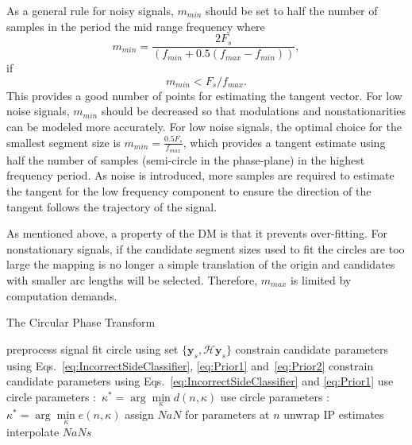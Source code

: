 \documentclass[journal,11pt,a4paper,onecolumn,draftcls]{IEEEtran}
\begin{document}
As a general rule for noisy signals, $m_{min}$ should be set to half the number of samples in the period the mid range frequency where
\begin{equation}\label{eq:MinNumberOfPoints}
	m_{min} = \frac{2F_s}{\left(f_{min}+0.5(f_{max}-f_{min})\right)},
\end{equation}
if 
\begin{equation}
	m_{min} < F_s/f_{max}.
\end{equation}
This provides a good number of points for estimating the tangent vector. For low noise signals, $m_{min}$ should be decreased so that modulations and nonstationarities can be modeled more accurately. For low noise signals, the optimal choice for the smallest segment size is $m_{min}=\frac{0.5F_s}{f_{max}}$, which provides a tangent estimate using half the number of samples (semi-circle in the phase-plane) in the highest frequency period. As noise is introduced, more samples are required to estimate the tangent for the low frequency component to ensure the direction of the tangent follows the trajectory of the signal.

As mentioned above, a property of the DM is that it prevents over-fitting. For nonstationary signals, if the candidate segment sizes used to fit the circles are too large the mapping is no longer a simple translation of the origin and candidates with smaller arc lengths will be selected. Therefore, $m_{max}$ is limited by computation demands.

\begin{algorithm}
\caption{The Circular Phase Transform}\label{CPTAlgorithm}
\begin{algorithmic}[1]
\State preprocess signal
        \State fit circle using set $\{\mathbf{y}_s,\mathcal{H}\mathbf{y}_s\}$
    \EndFor
            \State constrain candidate parameters using Eqs.~\ref{eq:IncorrectSideClassifier}, \ref{eq:Prior1} and~\ref{eq:Prior2}
        \Else
            \State constrain candidate parameters using Eqs.~\ref{eq:IncorrectSideClassifier} and \ref{eq:Prior1}
        \EndIf
            \State use circle parameters $:$ ${\kappa^ * } = \arg \mathop {\min }\limits_\kappa d\left( n,\kappa \right)$
        \Else
            \State use circle parameters $:$ ${\kappa^ * } = \arg \mathop {\min }\limits_\kappa e\left( n,\kappa \right)$
        \EndIf
    \Else
        \State assign $NaN$ for parameters at $n$
    \EndIf
\EndFor
\State unwrap IP estimates
\State interpolate $NaNs$
\end{algorithmic}
\end{algorithm}
\end{document}
